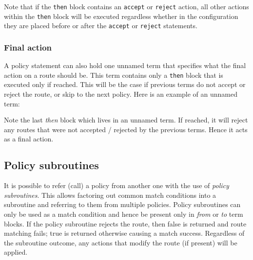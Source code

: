 Note that if the {\tt then} block contains an {\tt accept} or {\tt reject}
action, all other actions within the {\tt then} block will be executed
regardless whether in the configuration they are placed before or after
the {\tt accept} or {\tt reject} statements.

\subsubsection{Final action}
A policy statement can also hold one unnamed term that specifies what the
final action on a route should be.  This term contains only a {\tt then}
block that is executed only if reached.  This will be the case if previous terms
do not accept or reject the route, or skip to the next policy.  Here is an
example of an unnamed term:

\noindent{}

Note the last {\em then} block which lives in an unnamed term.  If reached, it
will reject any routes that were not accepted / rejected by the previous terms.
Hence it acts as a final action.

\subsection{Policy subroutines}
It is possible to refer (call) a policy from another one with the use of {\em
policy subroutines}.  This allows factoring out common match conditions into a
subroutine and referring to them from multiple policies.  Policy subroutines can
only be used as a match condition and hence be present only in {\em from} or
{\em to} term blocks.  If the policy subroutine rejects the route, then false is
returned and route matching fails; true is returned otherwise causing a match
success.  Regardless of the subroutine outcome, any actions that modify the
route (if present) will be applied.

